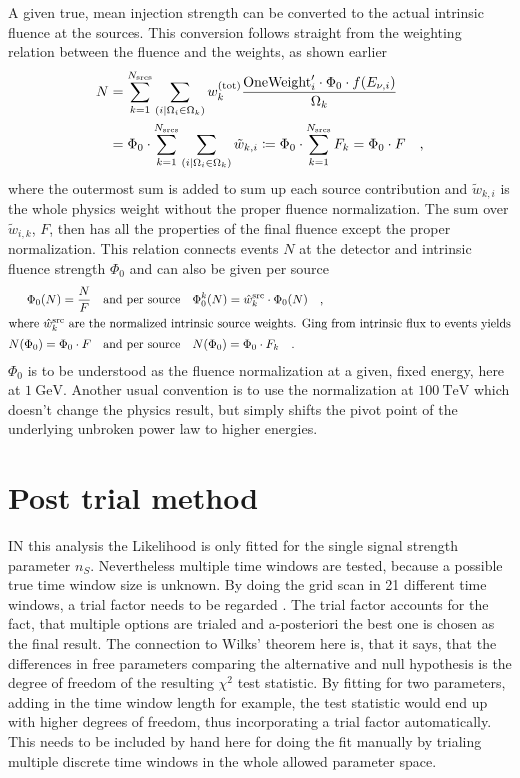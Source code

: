 A given true, mean injection strength can be converted to the actual intrinsic fluence at the sources.
This conversion follows straight from the weighting relation between the fluence and the weights, as shown earlier
\begin{align}
  N &= \sum_{k=1}^{N_\text{srcs}} \sum_{(i|\Omega_i \in \Omega_k)}
    w_k^{(\text{tot})}\frac{\text{OneWeight}'_i\cdot\Phi_0\cdot f(E_{\nu,i})}
                           {\Omega_k} \\
  &= \Phi_0 \cdot
      \sum_{k=1}^{N_\text{srcs}}
      \sum_{(i|\Omega_i \in \Omega_k)} \tilde{w}_{k,i}
  \coloneqq \Phi_0 \cdot \sum_{k=1}^{N_\text{srcs}} F_k = \Phi_0 \cdot F
  \quad\text{,}
\end{align}
where the outermost sum is added to sum up each source contribution and $\tilde{w}_{k,i}$ is the whole physics weight without the proper fluence normalization.
The sum over $\tilde{w}_{i,k}$, $F$, then has all the properties of the final fluence except the proper normalization.
This relation connects events $N$ at the detector and intrinsic fluence strength $\Phi_0$ and can also be given per source
\begin{align}
  \Phi_0(N) = \frac{N}{F}
    &\quad\text{and per source}\quad
    \Phi_0^k(N) = \hat{w}_k^\text{src} \cdot \Phi_0(N)
    \quad\text{,} \\
  \intertext{where $\hat{w}_k^\text{src}$ are the normalized intrinsic source weights. Ging from intrinsic flux to events yields}
  N(\Phi_0) = \Phi_0 \cdot F
    &\quad\text{and per source}\quad
    N(\Phi_0) = \Phi_0 \cdot F_k
  \quad\text{.}
\end{align}
$\Phi_0$ is to be understood as the fluence normalization at a given, fixed energy, here at $\SI{1}{\GeV}$.
Another usual convention is to use the normalization at $\SI{100}{\TeV}$ which doesn't change the physics result, but simply shifts the pivot point of the underlying unbroken power law to higher energies.

\section{Post trial method}
IN this analysis the Likelihood is only fitted for the single signal strength parameter $n_S$.
Nevertheless multiple time windows are tested, because a possible true time window size is unknown.
By doing the grid scan in 21 different time windows, a trial factor needs to be regarded .
The trial factor accounts for the fact, that multiple options are trialed and a-posteriori the best one is chosen as the final result.
The connection to Wilks' theorem here is, that it says, that the differences in free parameters comparing the alternative and null hypothesis is the degree of freedom of the resulting $\chi^2$ test statistic.
By fitting for two parameters, adding in the time window length for example, the test statistic would end up with higher degrees of freedom, thus incorporating a trial factor automatically.
This needs to be included by hand here for doing the fit manually by trialing multiple discrete time windows in the whole allowed parameter space.

